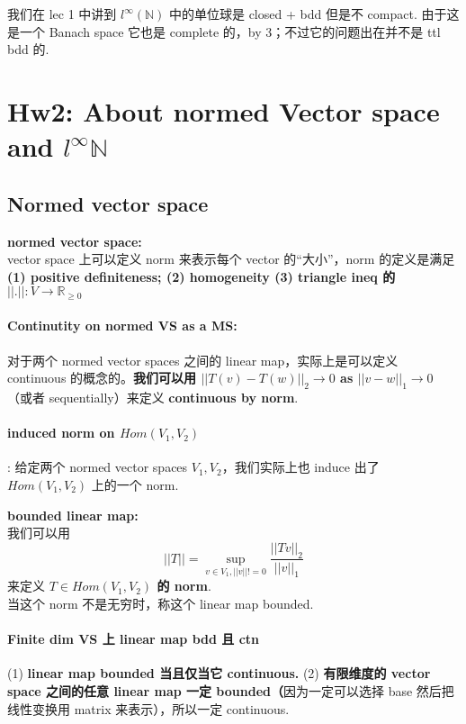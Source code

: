 \documentclass[lang=cn,11pt]{elegantbook}
\begin{document}
\begin{remark}
    我们在 lec 1 中讲到  $l^{\infty}(\mathbb{N})$ 中的单位球是 closed + bdd 但是不 compact. 由于这是一个 Banach space 它也是 complete 的，by 3；不过它的问题出在并不是 ttl bdd 的.
\end{remark}


\section{Hw2: About normed Vector space and $l^\infty{\mathbb{N}}$}
\subsection{Normed vector space}
\begin{definition}
    \textbf{normed vector space:} 
    \\vector space 上可以定义 norm 来表示每个 vector 的“大小”，norm 的定义是满足\\ \textbf{(1) positive definiteness; (2) homogeneity (3) triangle ineq 的 $||.||: V \rightarrow \mathbb{R}_{\geq0}$}
\end{definition}

\paragraph{Continutity on normed VS as a MS:} 对于两个 normed vector spaces 之间的 linear map，实际上是可以定义 continuous 的概念的。\textbf{我们可以用 $||T(v) - T(w)||_2 \rightarrow 0$ as $||v - w||_1 \rightarrow 0$} （或者 sequentially）来定义 \textbf{continuous by norm}.

\paragraph{induced norm on $Hom(V_1, V_2)$}: 给定两个 normed vector spaces $V_1, V_2$，我们实际上也 induce 出了 $Hom(V_1, V_2)$ 上的一个 norm. 

\begin{definition}
   \textbf{bounded linear map:} \\
   我们可以用 
   $$||T|| = \sup_{v \in V_1, ||v|| != 0} \frac{||Tv||_2}{||v||_1}$$
   来定义 \textbf{$T \in Hom(V_1, V_2)$ 的 norm}.
   \\当这个 norm 不是无穷时，称这个 linear map bounded.
\end{definition}
   
\paragraph{Finite dim VS 上 linear map bdd 且 ctn}
\begin{theorem}
    (1) \textbf{linear map bounded 当且仅当它 continuous.}
    (2)  \textbf{有限维度的 vector space 之间的任意 linear map 一定 bounded（}因为一定可以选择 base 然后把线性变换用 matrix 来表示），所以一定 continuous.
\end{theorem}
\end{document}
